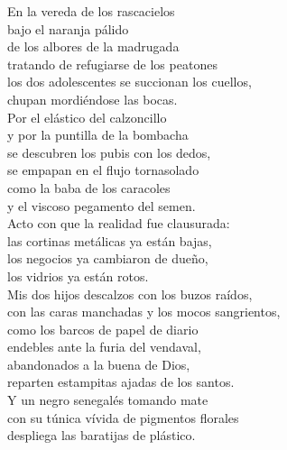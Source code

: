 

En la vereda de los rascacielos\\
bajo el naranja pálido\\
de los albores de la madrugada \\
tratando de refugiarse de los peatones\\
los dos adolescentes se succionan los cuellos,\\
chupan mordiéndose las bocas.\\
Por el elástico del calzoncillo\\
y por la puntilla de la bombacha\\
se descubren los pubis con los dedos,\\
se empapan en el flujo tornasolado\\
como la baba de los caracoles\\
y el viscoso pegamento del semen.\\
Acto con que la realidad fue clausurada: \\
las cortinas metálicas ya están bajas,\\
los negocios ya cambiaron de dueño,\\
los vidrios ya están rotos.\\
Mis dos hijos descalzos con los buzos raídos,\\
con las caras manchadas y los mocos sangrientos,\\
como los barcos de papel de diario\\
endebles ante la furia del vendaval,\\
abandonados a la buena de Dios,\\
reparten estampitas ajadas de los santos.\\
Y un negro senegalés tomando mate\\
con su túnica vívida de pigmentos florales\\
despliega las baratijas de plástico.\\

